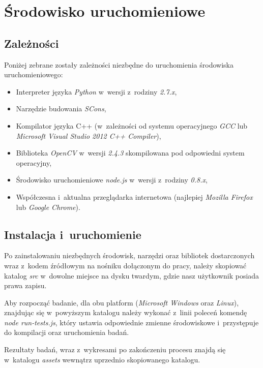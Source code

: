 \chapter{Środowisko uruchomieniowe}\label{Chapter_EnvironmentAppendix}
  \section{Zależności}\label{Section_Dependencies}

  Poniżej zebrane zostały zależności niezbędne do uruchomienia środowiska uruchomieniowego:
  \begin{itemize}
    \item Interpreter języka \textit{Python} w~wersji z~rodziny \textit{2.7.x},
    \item Narzędzie budowania \textit{SCons},
    \item Kompilator języka C++ (w~zależności od systemu operacyjnego \textit{GCC} lub \textit{Microsoft Visual Studio 2012 C++ Compiler}),
    \item Biblioteka \textit{OpenCV} w~wersji \textit{2.4.3} skompilowana pod odpowiedni system operacyjny,
    \item Środowisko uruchomieniowe \textit{node.js} w~wersji z~rodziny \textit{0.8.x},
    \item Współczesna i~aktualna przeglądarka internetowa (najlepiej \textit{Mozilla Firefox} lub \textit{Google Chrome}).
  \end{itemize}

  \section{Instalacja i~uruchomienie}\label{Section_Installation}

  Po zainstalowaniu niezbędnych środowisk, narzędzi oraz bibliotek dostarczonych wraz z~kodem źródłowym na nośniku dołączonym do pracy, należy skopiować katalog \textit{src} w~dowolne miejsce na dysku twardym, gdzie nasz użytkownik posiada prawa zapisu.

  Aby rozpocząć badanie, dla obu platform (\textit{Microsoft Windows} oraz \textit{Linux}), znajdując się w~powyższym katalogu należy wykonać z~linii poleceń komendę \textit{node run-tests.js}, który ustawia odpowiednie zmienne środowiskowe i~przystępuje do kompilacji oraz uruchomienia badań.

  Rezultaty badań, wraz z~wykresami po zakończeniu procesu znajdą się w~katalogu \textit{assets} wewnątrz uprzednio skopiowanego katalogu.